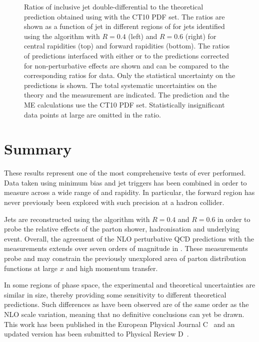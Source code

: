 \begin{figure}[htpb]
{    \label{fig:forward-inclusive:PowhegRatioForward_akt6}}
  \caption{Ratios of inclusive jet double-differential \xs to the theoretical
           prediction obtained using \NLOjetpp with the CT10 PDF set. The ratios
           are shown as a function of jet \pT in different regions of \absRap for
           jets identified using the \akt algorithm with $R=0.4$ (left) and
           $R=0.6$ (right) for central rapidities (top) and forward rapidities (bottom).
           The ratios of \Powheg predictions interfaced with
           either \Pythia or \Herwig to the \NLOjetpp predictions corrected for
           non-perturbative effects are shown and can be compared to the corresponding
           ratios for data. Only the statistical uncertainty on the \Powheg predictions
           is shown. The total systematic uncertainties on the theory and the measurement
           are indicated. The \NLOjetpp prediction and the \Powheg ME calculations
           use the CT10 PDF set. Statistically insignificant data points at large \pT
           are omitted in the ratio.}
  \label{fig:forward-inclusive:PowhegRatio}
\end{figure}


\section{Summary}
\label{sec:forward-inclusive:conclusions}
These results represent one of the most comprehensive tests of \QCD ever
performed. Data taken using minimum bias and jet triggers has been combined in
order to measure  across a wide range of \pT and rapidity. In particular,
the forward region has never previously been explored with such precision at a
hadron collider.

Jets are reconstructed using the \akt algorithm with $R=0.4$ and $R=0.6$ in
order to probe the relative effects of the parton shower, hadronisation and
underlying event. Overall, the agreement of the NLO perturbative QCD predictions
with the measurements extends over seven orders of magnitude in \xs. These
measurements probe and may constrain the previously unexplored area of parton
distribution functions at large $x$ and high momentum transfer.

In some regions of phase space, the experimental and theoretical uncertainties
are similar in size, thereby providing some sensitivity to different
theoretical predictions. Such differences as have been observed are of the same
order as the NLO scale variation, meaning that no definitive conclusions can yet be drawn. This work has been
published in the European Physical Journal C~\cite{EPJC:2011:ATLASInclusiveJets}
and an updated version has been submitted to Physical Review D~\cite{CERN-PH-EP-2011-192}.
